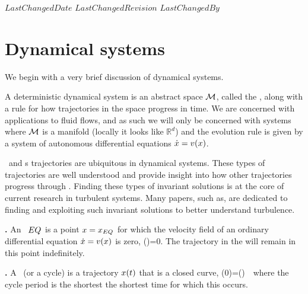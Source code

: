 
{$LastChangedDate$}
{$LastChangedRevision$} {$LastChangedBy$}

    \ifarticle
    \else

\section{Dynamical systems}

We begin with a very brief discussion of dynamical systems.

A deterministic dynamical system is an abstract space ${\cal M}$, called the {\statesp}, along with a rule for how trajectories in the space progress in time. We are concerned with applications to fluid flows, and as such we will only be concerned with systems where ${\cal M}$ is a manifold (locally it looks like $\mathbb{R}^d$) and the evolution rule is given by a system of autonomous differential equations $\dot{x}=v(x)$.

\Eqva\ and \po s trajectories are ubiquitous in dynamical systems. These types of trajectories are well understood and provide insight into how other trajectories progress through {\statesp}. Finding these types of invariant solutions is at the core of current research in turbulent systems. Many papers, such as, are dedicated to finding and exploiting such invariant solutions to better understand turbulence.

\begin{definition}
\textbf{\Eqv.}
\label{def:eqva}
An \eqv\ $EQ_{}$ is a point $x=x_{EQ_{}}$ for which the
velocity field of an ordinary differential equation
$\dot{x} = v(x)$ is zero,
\beq
\vel(\ssp)=0.
\eeq
The trajectory in the {\statesp} will remain in this point indefinitely.
\end{definition}

\begin{definition}
\textbf{\Po.}
\label{def:po}
A \po\ (or a cycle) is a trajectory $x(t)$ that is a closed curve,
\beq
\ssp(0)=\ssp(\period{}) \,\,
\eeq
where the cycle period \period{} is the shortest the shortest time for which this occurs.
\end{definition}

\subsection{\CLe}
	
